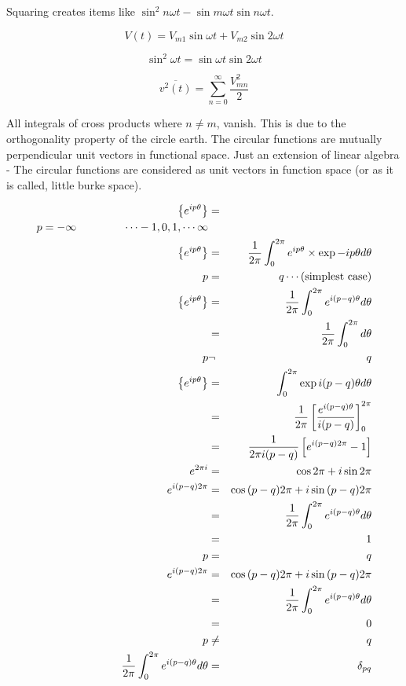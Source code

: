 \documentclass[a4paper,12pt]{article}
\begin{document}
Squaring creates items like $\sin^{2}{n \omega t} - \sin{m
\omega t}\sin{n \omega t}$.

\[ V(t) = V_{m1} \sin{\omega t} + V_{m2} \sin{2 \omega t} \]

\[ \sin^{2}{\omega t} = \sin{\omega t}\sin{2\omega t} \]

\[ \overline{v^{2}(t)} = \sum^{\infty}_{n = 0} \frac{V_{mn}^{2}}{2} \]

All integrals of cross products where $n \neq m$, vanish. This
is due to the orthogonality property of the circle earth. The circular
functions are mutually perpendicular unit vectors in functional space.
Just an extension of linear algebra - The circular functions are
considered as unit vectors in function space (or as it is called, little
burke space).

\begin{eqnarray*}
\left\{e^{ i p \theta } \right\} & = & \\
p = - \infty \hspace{15mm} \cdots -1, 0, 1, \cdots \infty \\
\left\{e^{ i p \theta } \right\} & = & \frac{1}{2 \pi} \int^{2
\pi}_{0} e^{i p \theta} \times \exp{- i p \theta} d \theta \\
p & = & q \cdots \mbox{(simplest case)} \\
\left\{e^{ i p \theta } \right\} & = & \frac{1}{2 \pi} \int^{2
\pi}_{0} e^{i(p - q) \theta} d \theta \\
	& = & \frac{1}{2 \pi} \int^{2 \pi}_{0} d \theta \\
p & \neg & q \\
\left\{e^{ i p \theta } \right\} & = & \int^{2 \pi}_{0} \exp{i(p -
q)\theta} d \theta \\
	& = & \frac{1}{2 \pi} \left[ \frac{e^{i(p - q)\theta}}{i(p - q)}
	\right]^{2 \pi}_{0} \\
	& = & \frac{1}{2 \pi i (p - q)} \left[ e^{i(p - q) 2 \pi} - 1
	\right] \\
e^{2 \pi i} & = & \cos{2 \pi} + i \sin{2 \pi} \\
e^{i(p - q) 2 \pi} & = & \cos{(p - q) 2 \pi} + i \sin{(p - q) 2 \pi} \\
		& = & \frac{1}{2 \pi} \int^{2 \pi}_{0} e^{i(p - q)\theta} d
		\theta \\
		& = & 1 \\
p		& = & q \\
e^{i(p - q) 2 \pi} & = & \cos{(p - q) 2 \pi} + i \sin{(p - q) 2 \pi} \\
& = & \frac{1}{2 \pi} \int^{2 \pi}_{0} e^{i(p - q)\theta} d\theta \\
		& = & 0 \\
p		& \neq & q \\
\frac{1}{2 \pi} \int^{2 \pi}_{0} e^{i(p - q) \theta} d	\theta & = &
\delta_{pq}
\end{eqnarray*}
\end{document}
